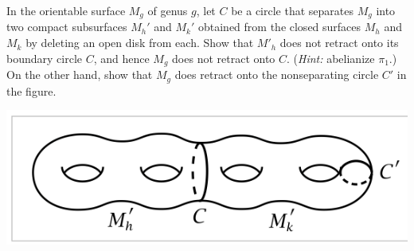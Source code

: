 \documentclass[12pt]{article}
\begin{document}
\begin{problem}{2}
    In the orientable surface $M_g$ of genus $g$, let $C$ be a circle that separates $M_g$ into two compact subsurfaces $M_h'$ and $M_k'$ obtained from the closed surfaces $M_h$ and $M_k$ by deleting an open disk from each. Show that $M'_h$ does not retract onto its boundary circle $C$, and hence $M_g$ does not retract onto $C$. (\emph{Hint:} abelianize $\pi_1$.) On the other hand, show that $M_g$ does retract onto the nonseparating circle $C'$ in the figure. 
    \begin{center}
        \includegraphics{assets/HW5Image.png}
    \end{center}
\end{problem}
\end{document}
